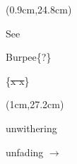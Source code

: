 \documentclass[a4paper,10pt]{article}
\begin{document}
\begin{textblock*}{2in}(0.9cm,24.8cm)%
    \small
    \begin{minipage}{2in} 
        \color{blue}
        See\par
        Burpee\{?\}\par
        \color{red}
        \{\sout{x x}\}\par
        \normalsize
    \end{minipage}%
\end{textblock*}%

\color{red}
\begin{textblock*}{5cm}(1cm,27.2cm)%
    \small
    \begin{minipage}{5cm} 
        \color{red}
        unwithering\par
        unfading $\rightarrow$
        \normalsize
    \end{minipage}%
\end{textblock*}%
\end{document}
